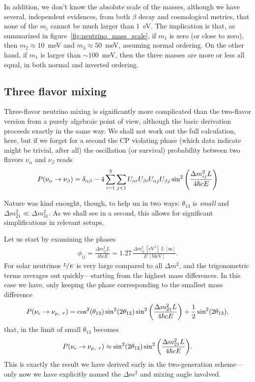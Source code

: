 In addition, we don't know the absolute scale of the masses, although we have several,
independent evidences, from both $\beta$ decay and cosmological metrics, that none
of the $m_i$ cannot be much larger than 1~eV. The implication is that, as summarized in
figure~\ref{fig:neutrino_mass_scale}, if $m_1$ is zero (or close to zero), then
$m_2 \approx 10$~meV and $m_3 \approx 50$~meV, assuming normal ordering. On the
other hand, if $m_1$ is larger than $\sim 100$~meV, then the three masses are more
or less all equal, in both normal and inverted ordering.


\subsection{Three flavor mixing}

Three-flavor neutrino mixing is significantly more complicated than the two-flavor
version from a purely algebraic point of view, although the basic derivation proceeds
exactly in the same way. We shall not work out the full calculation, here, but if we
forget for a second the CP violating phase (which data indicate might be trivial,
after all) the oscillation (or survival) probability between two flavors $\nu_\alpha$
and $\nu_\beta$ reads
\begin{align}
  P(\nu_\alpha \rightarrow \nu_\beta) = \delta_{\alpha\beta} -
  4\sum_{i=1}^{3}\sum_{j < 1} U_{\alpha i} U_{\beta i}U_{\alpha j} U_{\beta j}
  \sin^2\qty(\frac{\Delta m^2_{ij} L}{4\hbar c E})
\end{align}


Nature was kind enought, though, to help un in two ways: $\theta_{13}$ is
\emph{small} and $\Delta m^2_{21} \ll \Delta m^2_{31}$. As we shall see in a second,
this allows for significant simplifications in relevant setups.

Let us start by examining the phases
\begin{align*}
  \phi_{ij} = \frac{\Delta m^2_{ij} L}{4 \hbar c E} =
  1.27\, \frac{\Delta m^2_{ij}~[\text{eV}^2]~L~[\text{m}]}{E~[\text{MeV}]}.
\end{align*}
For solar neutrinos $\nicefrac{L}{E}$ is very large compared to all $\Delta m^2$,
and the trigonometric terms averages out quickly---starting from the highest mass
differences. In this case we have, only keeping the phase corresponding to the
smallest mass difference
\begin{align*}
  P(\nu_e \rightarrow \nu_{\mu,~\tau}) =
  \cos^2(\theta_{13})\sin^2(2\theta_{12})\sin^2\qty(\frac{\Delta m^2_{21} L}{4\hbar c E}) +
  \frac{1}{2}\sin^2(2\theta_{13}),
\end{align*}
that, in the limit of small $\theta_{13}$ becomes
\begin{align*}
  P(\nu_e \rightarrow \nu_{\mu,~\tau}) \approx
  \sin^2(2\theta_{12})\sin^2\qty(\frac{\Delta m^2_{21} L}{4\hbar c E}).
\end{align*}
This is exactly the result we have derived early in the two-generation scheme---only
now we have explicitly named the $\Delta m^2$ and mixing angle involved.

